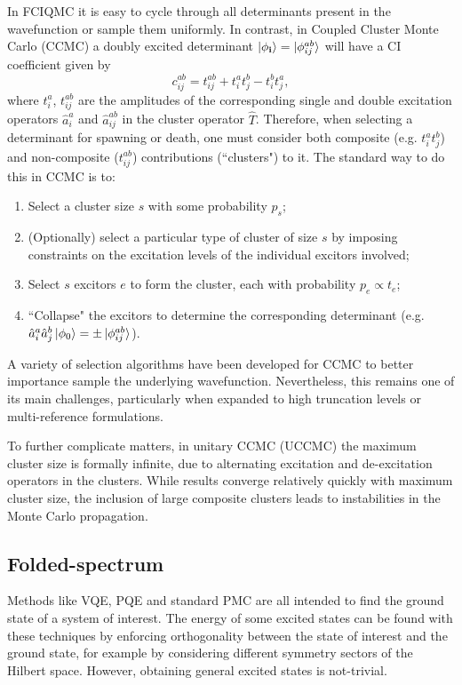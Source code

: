 \documentclass[%
 reprint,
 amsmath,amssymb,
 aps,
]{revtex4-2}
\begin{document}
In FCIQMC it is easy to cycle through all determinants present in the wavefunction or sample them uniformly. In contrast, in Coupled Cluster Monte Carlo (CCMC) a doubly excited determinant $\ket{\phi_\mathbf{i}} = \ket{\phi_{ij}^{ab}}$ will have a CI coefficient given by
\begin{equation}
    c_{ij}^{ab} = t_{ij}^{ab} + t_{i}^at_j^b - t_i^bt_j^a,
\end{equation}
where $t_{i}^a$, $t_{ij}^{ab}$ are the amplitudes of the corresponding single and double excitation operators $\hat a_i^a$ and $\hat a_{ij}^{ab}$ in the cluster operator $\hat T$. Therefore, when selecting a determinant for spawning or death, one must consider both composite (e.g. $t_{i}^at_j^b$) and non-composite ($t_{ij}^{ab}$) contributions (``clusters") to it. The standard way to do this in CCMC\cite{Thom2010, Scott2017} is to:
\begin{enumerate}
    \item Select a cluster size $s$ with some probability $p_s$;
    \item (Optionally) select a particular type of cluster of size $s$ by imposing constraints on the excitation levels of the individual excitors involved;\cite{Scott2017}
    \item Select $s$ excitors $e$ to form the cluster, each with probability $p_e \propto t_e$;
    \item ``Collapse" the excitors to determine the corresponding determinant (e.g. $\hat a_i^a \hat a_j^b \ket{\phi_0} = \pm\ket{\phi_{ij}^{ab}}$).
\end{enumerate}

A variety of selection algorithms have been developed for CCMC  to better importance sample the underlying wavefunction.\cite{Scott2017} Nevertheless, this remains one of its main challenges, particularly when expanded to high truncation levels\cite{Neufeld2017} or multi-reference formulations.\cite{Filip2019} 

To further complicate matters, in unitary CCMC (UCCMC)\cite{Filip2020} the maximum cluster size is formally infinite, due to alternating excitation and de-excitation operators in the clusters. While results converge relatively quickly with maximum cluster size, the inclusion of large composite clusters leads to instabilities in the Monte Carlo propagation.


\subsection{Folded-spectrum} 
Methods like VQE, PQE and standard PMC are all intended to find the ground state of a system of interest. The energy of some excited states can be found with these techniques by enforcing orthogonality between the state of interest and the ground state, for example by considering different symmetry sectors of the Hilbert space.\cite{Nakanishi2019} However, obtaining general excited states is not-trivial.
\end{document}
